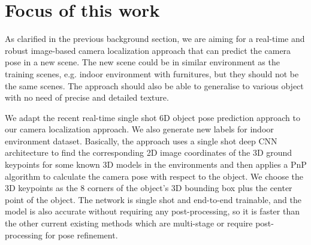 \section{Focus of this work}

As clarified in the previous background section, we are aiming for a real-time and robust image-based camera localization approach that can predict the camera pose in a new scene. The new scene could be in similar environment as the training scenes, e.g. indoor environment with furnitures, but they should not be the same scenes. The approach should also be able to generalise to various object with no need of precise and detailed texture.

We adapt the recent real-time single shot 6D object pose prediction approach \cite{tekin2018real} to our camera localization approach. We also generate new labels for indoor environment dataset. Basically, the approach uses a single shot deep CNN architecture to find the corresponding 2D image coordinates of the 3D ground keypoints for some known 3D models in the environments and then applies a PnP algorithm to calculate the camera pose with respect to the object. We choose the 3D keypoints as the 8 corners of the object's 3D bounding box plus the center point of the object. The network is single shot and end-to-end trainable, and the model is also accurate without requiring any post-processing, so it is faster than the other current existing methods which are multi-stage or require post-processing for pose refinement.